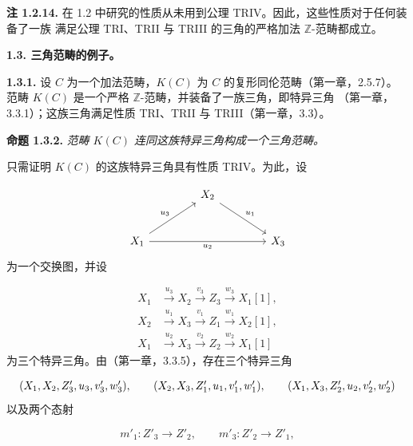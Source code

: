 
\clearpage
{}%
\begingroup
\small
\setlength{\emergencystretch}{1.5em}%
\setlength{\abovedisplayskip}{4pt plus 2pt minus 2pt}%
\setlength{\belowdisplayskip}{4pt plus 2pt minus 2pt}%

\noindent\textbf{注 1.2.14.}\quad
在 1.2 中研究的性质从未用到公理 TRIV。因此，这些性质对于任何装备了一族
满足公理 TRI、TRII 与 TRIII 的三角的严格加法 $\mathbb Z$-范畴都成立。

\medskip
\noindent\textbf{1.3. 三角范畴的例子。}

\medskip
\noindent\textbf{1.3.1.}\quad
设 $C$ 为一个加法范畴，$K(C)$ 为 $C$ 的复形同伦范畴（第一章，2.5.7）。
范畴 $K(C)$ 是一个严格 $\mathbb Z$-范畴，并装备了一族三角，即特异三角
（第一章，3.3.1）；这族三角满足性质 TRI、TRII 与 TRIII（第一章，3.3）。

\medskip
\noindent\textbf{命题 1.3.2.}\quad
\textit{范畴 $K(C)$ 连同这族特异三角构成一个三角范畴。}

只需证明 $K(C)$ 的这族特异三角具有性质 TRIV。为此，设

\[
  \begin{tikzcd}[column sep=4.2em,row sep=2.6em]
    & X_2 \arrow[dr,"u_1"] & \\
    X_1 \arrow[ur,"u_3"] \arrow[rr,"u_2"'] && X_3
  \end{tikzcd}
\]
\noindent 为一个交换图，并设

\[
  \begin{aligned}
    X_1&\xrightarrow{u_3}X_2\xrightarrow{v_3}Z_3
      \xrightarrow{w_3}X_1[1],\\
    X_2&\xrightarrow{u_1}X_3\xrightarrow{v_1}Z_1
      \xrightarrow{w_1}X_2[1],\\
    X_1&\xrightarrow{u_2}X_3\xrightarrow{v_2}Z_2
      \xrightarrow{w_2}X_1[1]
  \end{aligned}
\]
\noindent 为三个特异三角。由（第一章，3.3.5），存在三个特异三角

\[
  \resizebox{0.98\linewidth}{!}{$
    (X_1,X_2,Z'_3,u_3,v'_3,w'_3),\qquad
    (X_2,X_3,Z'_1,u_1,v'_1,w'_1),\qquad
    (X_1,X_3,Z'_2,u_2,v'_2,w'_2)
  $}
\]
\noindent 以及两个态射

\[
  m'_1\colon Z'_3\longrightarrow Z'_2,\qquad
  m'_3\colon Z'_2\longrightarrow Z'_1,
\]
\endgroup


